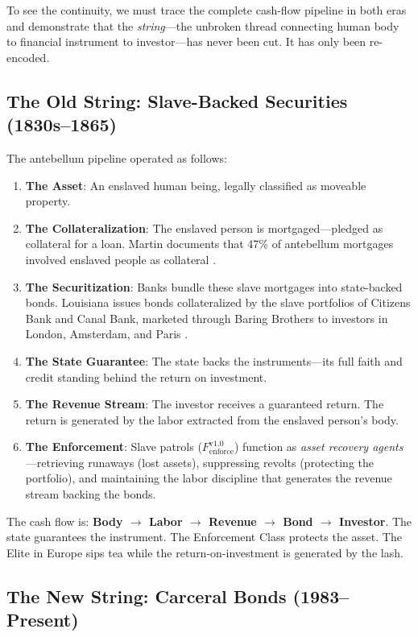\documentclass[12pt,openany]{book}
\begin{document}
To see the continuity, we must trace the complete cash-flow pipeline in both eras and demonstrate that the \textit{string}---the unbroken thread connecting human body to financial instrument to investor---has never been cut. It has only been re-encoded.

\subsection{The Old String: Slave-Backed Securities (1830s--1865)}

The antebellum pipeline operated as follows:

\begin{enumerate}
    \item \textbf{The Asset}: An enslaved human being, legally classified as moveable property.
    \item \textbf{The Collateralization}: The enslaved person is mortgaged---pledged as collateral for a loan. Martin documents that 47\% of antebellum mortgages involved enslaved people as collateral \cite{martin}.
    \item \textbf{The Securitization}: Banks bundle these slave mortgages into state-backed bonds. Louisiana issues bonds collateralized by the slave portfolios of Citizens Bank and Canal Bank, marketed through Baring Brothers to investors in London, Amsterdam, and Paris \cite{murphy}.
    \item \textbf{The State Guarantee}: The state backs the instruments---its full faith and credit standing behind the return on investment.
    \item \textbf{The Revenue Stream}: The investor receives a guaranteed return. The return is generated by the labor extracted from the enslaved person's body.
    \item \textbf{The Enforcement}: Slave patrols ($F_{\text{enforce}}^{\text{v1.0}}$) function as \textit{asset recovery agents}---retrieving runaways (lost assets), suppressing revolts (protecting the portfolio), and maintaining the labor discipline that generates the revenue stream backing the bonds.
\end{enumerate}

The cash flow is: \textbf{Body $\rightarrow$ Labor $\rightarrow$ Revenue $\rightarrow$ Bond $\rightarrow$ Investor}. The state guarantees the instrument. The Enforcement Class protects the asset. The Elite in Europe sips tea while the return-on-investment is generated by the lash.

\subsection{The New String: Carceral Bonds (1983--Present)}
\end{document}
